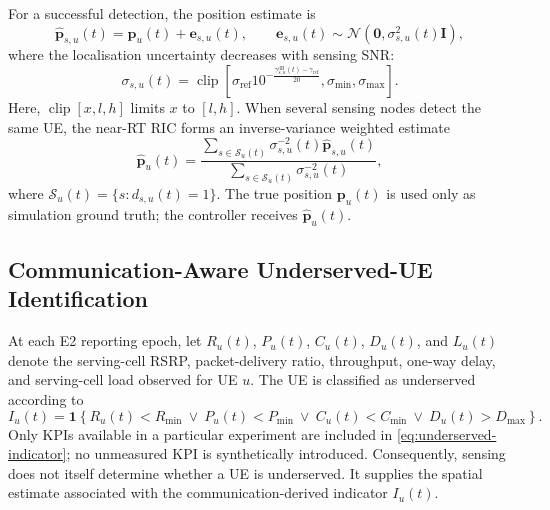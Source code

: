 For a successful detection, the position estimate is
\begin{equation}
 \widehat{\mathbf{p}}_{s,u}(t)
 =\mathbf{p}_u(t)+\mathbf{e}_{s,u}(t),\qquad
 \mathbf{e}_{s,u}(t)\sim
 \mathcal{N}\!\left(\mathbf{0},
 \sigma_{s,u}^2(t)\mathbf{I}\right),
 \label{eq:sensed-position}
\end{equation}
where the localisation uncertainty decreases with sensing SNR:
\begin{equation}
 \sigma_{s,u}(t)=\operatorname{clip}\!\left[
 \sigma_{\mathrm{ref}}
 10^{-\frac{\gamma_{s,u}^{\mathrm{dB}}(t)-\gamma_{\mathrm{ref}}}{20}},
 \sigma_{\min},\sigma_{\max}\right].
 \label{eq:localisation-uncertainty}
\end{equation}
Here, $\operatorname{clip}[x,l,h]$ limits $x$ to $[l,h]$.
When several sensing nodes detect the same UE, the near-RT RIC forms
an inverse-variance weighted estimate
\begin{equation}
 \widehat{\mathbf{p}}_u(t)=
 \frac{\displaystyle\sum_{s\in\mathcal{S}_u(t)}
 \sigma_{s,u}^{-2}(t)\widehat{\mathbf{p}}_{s,u}(t)}
 {\displaystyle\sum_{s\in\mathcal{S}_u(t)}
 \sigma_{s,u}^{-2}(t)},
 \label{eq:sensing-fusion}
\end{equation}
where $\mathcal{S}_u(t)=\{s:d_{s,u}(t)=1\}$.
The true position $\mathbf{p}_u(t)$ is used only as simulation ground
truth; the controller receives $\widehat{\mathbf{p}}_u(t)$.

\subsection{Communication-Aware Underserved-UE Identification}

At each E2 reporting epoch, let $R_u(t)$, $P_u(t)$, $C_u(t)$,
$D_u(t)$, and $L_u(t)$ denote the serving-cell RSRP, packet-delivery
ratio, throughput, one-way delay, and serving-cell load observed for
UE $u$. The UE is classified as underserved according to
\begin{equation}
 I_u(t)=\mathbf{1}\!\left\{
 R_u(t)<R_{\min}\ \lor\
 P_u(t)<P_{\min}\ \lor\
 C_u(t)<C_{\min}\ \lor\
 D_u(t)>D_{\max}
 \right\}.
 \label{eq:underserved-indicator}
\end{equation}
Only KPIs available in a particular experiment are included in
\eqref{eq:underserved-indicator}; no unmeasured KPI is synthetically
introduced. Consequently, sensing does not itself determine whether
a UE is underserved. It supplies the spatial estimate associated
with the communication-derived indicator $I_u(t)$.

